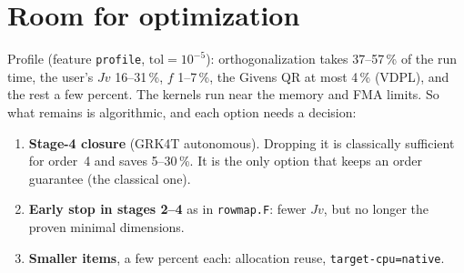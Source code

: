\documentclass[11pt,a4paper]{article}
\begin{document}
\section{Room for optimization}

Profile (feature \texttt{profile}, $\mathrm{tol}=10^{-5}$): orthogonalization
takes 37--57\,\% of the run time, the user's $Jv$ 16--31\,\%, $f$ 1--7\,\%,
the Givens QR at most 4\,\% (VDPL), and the rest a few percent. The kernels run near the
memory and FMA limits. So what remains is algorithmic, and each option needs
a decision:

\begin{enumerate}
  \item \textbf{Stage-4 closure} (GRK4T autonomous). Dropping it is
    classically sufficient for order~4 and saves 5--30\,\%. It is the only
    option that keeps an order guarantee (the classical one).
  \item \textbf{Early stop in stages 2--4} as in \texttt{rowmap.F}: fewer
    $Jv$, but no longer the proven minimal dimensions.
  \item \textbf{Smaller items}, a few percent each: allocation reuse,
    \texttt{target-cpu=native}.
\end{enumerate}
\end{document}
